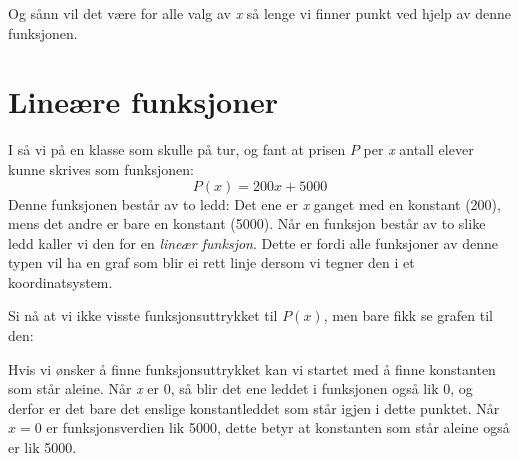 Og sånn vil det være for alle valg av \textit{x} så lenge vi finner punkt ved hjelp av denne funksjonen.

\section{Lineære funksjoner}
I  så vi på en klasse som skulle på tur, og fant at prisen $ P $ per \textit{x} antall elever kunne skrives som funksjonen:
\[ P(x)=200x+5000 \]
Denne funksjonen består av to ledd: Det ene er \textit{x} ganget med en konstant (200), mens det andre er bare en konstant (5000). Når en funksjon består av to slike ledd kaller vi den for en \textit{lineær funksjon}. Dette er fordi alle funksjoner av denne typen vil ha en graf som blir ei rett linje dersom vi tegner den i et koordinatsystem. 

 Si nå at vi ikke visste funksjonsuttrykket til $ P(x) $, men bare fikk se grafen til den: 

\begin{figure}[H]
\centering
{}
\pgfplotsset{scaled y ticks=false}
\end{figure}

Hvis vi ønsker å finne funksjonsuttrykket kan vi startet med å finne konstanten som står aleine. Når \textit{x} er 0, så blir det ene leddet i funksjonen også lik 0, og derfor er det bare det enslige konstantleddet som står igjen i dette punktet. Når $ x=0 $ er funksjonsverdien lik 5000, dette betyr at konstanten som står aleine også er lik 5000.

